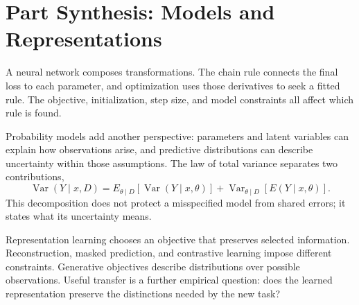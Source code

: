 \chapter*{Part Synthesis: Models and Representations}

A neural network composes transformations. The chain rule connects the final loss to each parameter, and optimization uses those derivatives to seek a fitted rule. The objective, initialization, step size, and model constraints all affect which rule is found.

Probability models add another perspective: parameters and latent variables can explain how observations arise, and predictive distributions can describe uncertainty within those assumptions. The law of total variance separates two contributions,
\[
\operatorname{Var}(Y\mid x,D)=
E_{\theta\mid D}[\operatorname{Var}(Y\mid x,\theta)]
+\operatorname{Var}_{\theta\mid D}[E(Y\mid x,\theta)].
\]
This decomposition does not protect a misspecified model from shared errors; it states what its uncertainty means.

Representation learning chooses an objective that preserves selected information. Reconstruction, masked prediction, and contrastive learning impose different constraints. Generative objectives describe distributions over possible observations. Useful transfer is a further empirical question: does the learned representation preserve the distinctions needed by the new task?

\clearpage
\begingroup\pagestyle{empty}\cleardoublepage\endgroup
